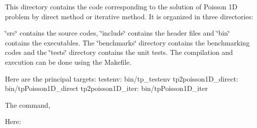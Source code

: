 This directory contains the code corresponding to the solution of Poisson 1D problem by direct method or iterative method. It is organized in three directories\+: 
\begin{DoxyCode}{0}
\end{DoxyCode}


\char`\"{}src\char`\"{} contains the source codes, \char`\"{}include\char`\"{} contains the header files and \char`\"{}bin\char`\"{} contains the executables. The \char`\"{}benchmarks\char`\"{} directory contains the benchmarking codes and the \char`\"{}tests\char`\"{} directory contains the unit tests. The compilation and execution can be done using the Makefile.

Here are the principal targets\+: testenv\+: bin/tp\+\_\+testenv tp2poisson1\+D\+\_\+direct\+: bin/tp\+Poisson1\+D\+\_\+direct tp2poisson1\+D\+\_\+iter\+: bin/tp\+Poisson1\+D\+\_\+iter

The command, 
\begin{DoxyCode}{0}
\end{DoxyCode}



\begin{DoxyCode}{0}
\end{DoxyCode}



\begin{DoxyCode}{0}
\end{DoxyCode}



\begin{DoxyCode}{0}
\end{DoxyCode}


Here\+: 
\begin{DoxyCode}{0}
\end{DoxyCode}
 